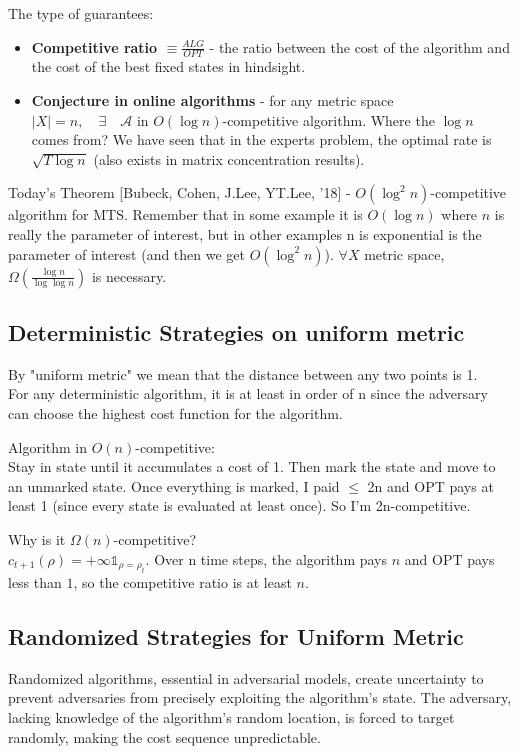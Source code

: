 \documentclass[11pt]{book} %
\begin{document}
The type of guarantees:
\begin{itemize}
    \item \textbf{Competitive ratio $\equiv \frac{ALG}{OPT}$} - the ratio between the cost of the algorithm and the cost of the best fixed states in hindsight. 
    \item \textbf{Conjecture in online algorithms} - for any metric space $|X| = n, \quad \exists \quad \mathcal{A} \text{ in } O(\log n)$-competitive algorithm.
        Where the $\log n$ comes from? We have seen that in the experts problem, the optimal rate is $\sqrt{T \log n}$ (also exists in matrix concentration results).
\end{itemize}

Today's Theorem [Bubeck, Cohen, J.Lee, YT.Lee, '18] - $O(\log^2 n)$-competitive algorithm for MTS.
Remember that in some example it is $O(\log n)$ where $n$ is really the parameter of interest, 
but in other examples n is exponential is the parameter of interest (and then we get $O(\log^2 n)$).
$\forall X$ metric space, $\Omega(\frac{\log n}{\log \log n})$ is necessary.

\subsection{Deterministic Strategies on uniform metric}

By "uniform metric" we mean that the distance between any two points is 1. \\
For any deterministic algorithm, it is at least in order of n since the adversary can choose the highest cost function for the algorithm.

Algorithm in $O(n)$-competitive: \\
Stay in state until it accumulates a cost of 1. 
Then mark the state and move to an unmarked state. 
Once everything is marked, I paid $\leq$ 2n and OPT pays at least 1 (since every state is evaluated at least once). So I'm 2n-competitive.

Why is it $\Omega(n)$-competitive? \\
$c_{t+1}(\rho) = +\infty \mathds{1}_{\rho = \rho_t}$.
Over n time steps, the algorithm pays $n$ and OPT pays less than $1$, so the competitive ratio is at least $n$.


\subsection{Randomized Strategies for Uniform Metric}
Randomized algorithms, essential in adversarial models, create uncertainty to prevent adversaries from precisely exploiting the algorithm's state. 
The adversary, lacking knowledge of the algorithm's random location, is forced to target randomly, making the cost sequence unpredictable.
\end{document}
